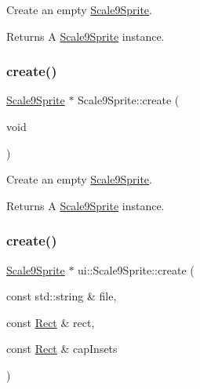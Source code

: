 Create an empty \hyperlink{classui_1_1Scale9Sprite}{Scale9\+Sprite}. 

\begin{DoxyReturn}{Returns}
A \hyperlink{classui_1_1Scale9Sprite}{Scale9\+Sprite} instance. 
\end{DoxyReturn}
\mbox{\label{classui_1_1Scale9Sprite_a2ea6cc4e7406fe2ce2559e3e7ada4ac0}} 
\subsubsection{\texorpdfstring{create()}{create()}\hspace{0.1cm}{\footnotesize\ttfamily [2/10]}}
{\footnotesize\ttfamily \hyperlink{classui_1_1Scale9Sprite}{Scale9\+Sprite} $\ast$ Scale9\+Sprite\+::create (\begin{DoxyParamCaption}\item[{void}]{ }\end{DoxyParamCaption})\hspace{0.3cm}{\ttfamily [static]}}



Create an empty \hyperlink{classui_1_1Scale9Sprite}{Scale9\+Sprite}. 

\begin{DoxyReturn}{Returns}
A \hyperlink{classui_1_1Scale9Sprite}{Scale9\+Sprite} instance. 
\end{DoxyReturn}
\mbox{\label{classui_1_1Scale9Sprite_a5a5bad2e9dc0f1ef6a96470d96af9886}} 
\subsubsection{\texorpdfstring{create()}{create()}\hspace{0.1cm}{\footnotesize\ttfamily [3/10]}}
{\footnotesize\ttfamily \hyperlink{classui_1_1Scale9Sprite}{Scale9\+Sprite} $\ast$ ui\+::\+Scale9\+Sprite\+::create (\begin{DoxyParamCaption}\item[{const std\+::string \&}]{file,  }\item[{const \hyperlink{classRect}{Rect} \&}]{rect,  }\item[{const \hyperlink{classRect}{Rect} \&}]{cap\+Insets }\end{DoxyParamCaption})\hspace{0.3cm}{\ttfamily [static]}}

